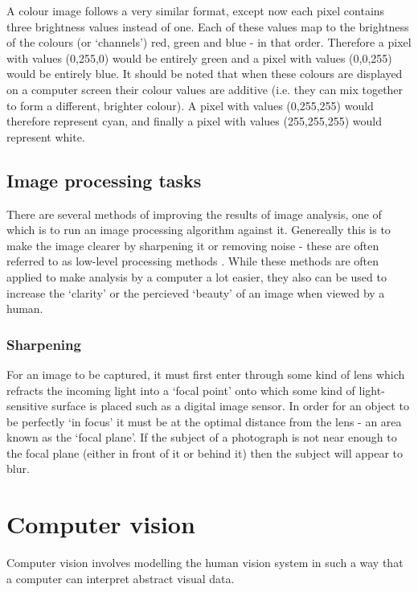 \documentclass[a4paper,12pt]{report}
\begin{document}
      A colour image follows a very similar format, except now each pixel contains three brightness values instead of one. Each of these values map to the brightness of the colours (or ‘channels’) red, green and blue - in that order. Therefore a pixel with values (0,255,0) would be entirely green and a pixel with values (0,0,255) would be entirely blue. It should be noted that when these colours are displayed on a computer screen their colour values are additive (i.e. they can mix together to form a different, brighter colour). A pixel with values (0,255,255) would therefore represent cyan, and finally a pixel with values (255,255,255) would represent white.

    \subsection{Image processing tasks}
      There are several methods of improving the results of image analysis, one of which is to run an image processing algorithm against it. Genereally this is to make the image clearer by sharpening it or removing noise - these are often referred to as low-level processing methods \citep{sonka2014image}. While these methods are often applied to make analysis by a computer a lot easier, they also can be used to increase the ‘clarity’ or the percieved ‘beauty’ of an image when viewed by a human.

      \subsubsection{Sharpening}
        For an image to be captured, it must first enter through some kind of lens which refracts the incoming light into a ‘focal point’ onto which some kind of light-sensitive surface is placed such as a digital image sensor. In order for an object to be perfectly ‘in focus’ it must be at the optimal distance from the lens - an area known as the ‘focal plane’. If the subject of a photograph is not near enough to the focal plane (either in front of it or behind it) then the subject will appear to blur.

  \section{Computer vision}
    Computer vision involves modelling the human vision system in such a way that a computer can interpret abstract visual data.



\end{document}
